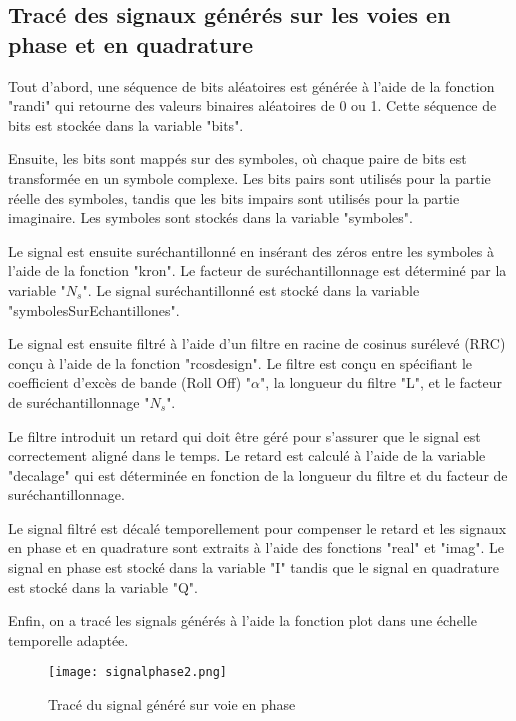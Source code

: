 \documentclass[11pt]{article}
\begin{document}
\newpage
\subsection{Tracé des signaux générés sur les voies en phase et en quadrature}

Tout d'abord, une séquence de bits aléatoires est générée à l'aide de la fonction "randi" qui retourne des valeurs binaires aléatoires de 0 ou 1. Cette séquence de bits est stockée dans la variable "bits".

Ensuite, les bits sont mappés sur des symboles, où chaque paire de bits est transformée en un symbole complexe. Les bits pairs sont utilisés pour la partie réelle des symboles, tandis que les bits impairs sont utilisés pour la partie imaginaire. Les symboles sont stockés dans la variable "symboles".

Le signal est ensuite suréchantillonné en insérant des zéros entre les symboles à l'aide de la fonction "kron". Le facteur de suréchantillonnage est déterminé par la variable "$N_s$". Le signal suréchantillonné est stocké dans la variable "symbolesSurEchantillones".

Le signal est ensuite filtré à l'aide d'un filtre en racine de cosinus surélevé (RRC) conçu à l'aide de la fonction "rcosdesign". Le filtre est conçu en spécifiant le coefficient d'excès de bande (Roll Off) "$\alpha$", la longueur du filtre "L", et le facteur de suréchantillonnage "$N_s$".

Le filtre introduit un retard qui doit être géré pour s'assurer que le signal est correctement aligné dans le temps. Le retard est calculé à l'aide de la variable "decalage" qui est déterminée en fonction de la longueur du filtre et du facteur de suréchantillonnage.

Le signal filtré est décalé temporellement pour compenser le retard et les signaux en phase et en quadrature sont extraits à l'aide des fonctions "real" et "imag". Le signal en phase est stocké dans la variable "I" tandis que le signal en quadrature est stocké dans la variable "Q".

Enfin, on a tracé les signals générés à l'aide la fonction plot dans une échelle temporelle adaptée.\\

\begin{figure}[ht!]
    \centering
    \texttt{[image: signalphase2.png]}
    \caption{Tracé du signal généré sur voie en phase \label{fig : SignalPhase}}
\end{figure}
\end{document}
